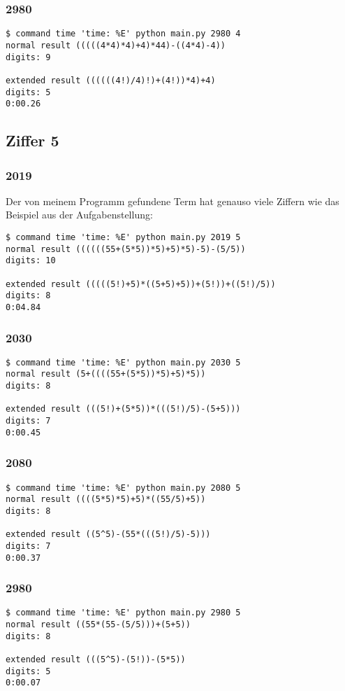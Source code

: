 \subsubsection{2980}
\begin{lstlisting}
$ command time 'time: %E' python main.py 2980 4
normal result (((((4*4)*4)+4)*44)-((4*4)-4))
digits: 9

extended result ((((((4!)/4)!)+(4!))*4)+4)
digits: 5
0:00.26
\end{lstlisting}
\subsection{Ziffer 5}
\subsubsection{2019}
Der von meinem Programm gefundene Term hat genauso viele Ziffern wie das Beispiel aus der Aufgabenstellung:
\begin{lstlisting}
$ command time 'time: %E' python main.py 2019 5
normal result ((((((55+(5*5))*5)+5)*5)-5)-(5/5))
digits: 10

extended result (((((5!)+5)*((5+5)+5))+(5!))+((5!)/5))
digits: 8
0:04.84
\end{lstlisting}
\subsubsection{2030}
\begin{lstlisting}
$ command time 'time: %E' python main.py 2030 5
normal result (5+((((55+(5*5))*5)+5)*5))
digits: 8

extended result (((5!)+(5*5))*(((5!)/5)-(5+5)))
digits: 7
0:00.45
\end{lstlisting}
\subsubsection{2080}
\begin{lstlisting}
$ command time 'time: %E' python main.py 2080 5
normal result ((((5*5)*5)+5)*((55/5)+5))
digits: 8

extended result ((5^5)-(55*(((5!)/5)-5)))
digits: 7
0:00.37
\end{lstlisting}
\subsubsection{2980}
\begin{lstlisting}
$ command time 'time: %E' python main.py 2980 5
normal result ((55*(55-(5/5)))+(5+5))
digits: 8

extended result (((5^5)-(5!))-(5*5))
digits: 5
0:00.07
\end{lstlisting}

